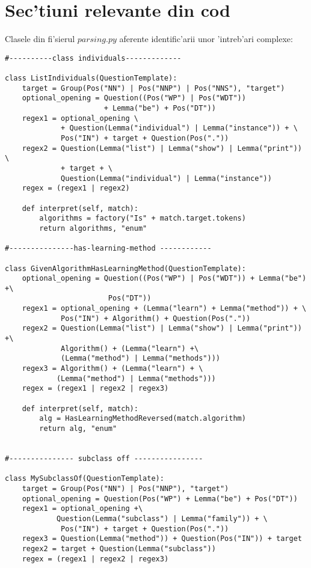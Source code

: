 \appendix
\chapter{Sec'tiuni relevante din cod}
Clasele din fi'sierul $parsing.py$ aferente identific'arii unor 'intreb'ari complexe:

\begin{verbatim}
#----------class individuals-------------

class ListIndividuals(QuestionTemplate):
    target = Group(Pos("NN") | Pos("NNP") | Pos("NNS"), "target")
    optional_opening = Question((Pos("WP") | Pos("WDT"))
                       + Lemma("be") + Pos("DT"))
    regex1 = optional_opening \
             + Question(Lemma("individual") | Lemma("instance")) + \
             Pos("IN") + target + Question(Pos("."))
    regex2 = Question(Lemma("list") | Lemma("show") | Lemma("print")) \
             + target + \
             Question(Lemma("individual") | Lemma("instance"))
    regex = (regex1 | regex2)

    def interpret(self, match):
        algorithms = factory("Is" + match.target.tokens)
        return algorithms, "enum"

#---------------has-learning-method ------------

class GivenAlgorithmHasLearningMethod(QuestionTemplate):
    optional_opening = Question((Pos("WP") | Pos("WDT")) + Lemma("be") +\
                        Pos("DT"))
    regex1 = optional_opening + (Lemma("learn") + Lemma("method")) + \
             Pos("IN") + Algorithm() + Question(Pos("."))
    regex2 = Question(Lemma("list") | Lemma("show") | Lemma("print")) +\ 
             Algorithm() + (Lemma("learn") +\ 
             (Lemma("method") | Lemma("methods")))
    regex3 = Algorithm() + (Lemma("learn") + \ 
            (Lemma("method") | Lemma("methods")))
    regex = (regex1 | regex2 | regex3)

    def interpret(self, match):
        alg = HasLearningMethodReversed(match.algorithm)
        return alg, "enum"


#--------------- subclass off ----------------

class MySubclassOf(QuestionTemplate):
    target = Group(Pos("NN") | Pos("NNP"), "target")
    optional_opening = Question(Pos("WP") + Lemma("be") + Pos("DT"))
    regex1 = optional_opening +\ 
            Question(Lemma("subclass") | Lemma("family")) + \
             Pos("IN") + target + Question(Pos("."))
    regex3 = Question(Lemma("method")) + Question(Pos("IN")) + target
    regex2 = target + Question(Lemma("subclass"))
    regex = (regex1 | regex2 | regex3)


\end{verbatim}
